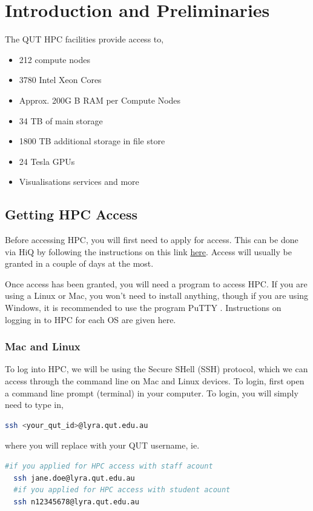 \section{Introduction and Preliminaries}
%
%
%
%
The QUT HPC facilities provide access to,
\begin{itemize}
\item 212 compute nodes
\item 3780 Intel Xeon Cores
\item Approx. 200G B RAM per Compute Nodes
\item 34 TB of main storage
\item 1800 TB additional storage in file store
\item 24 Tesla GPUs
\item Visualisations services and more
\end{itemize}
%
%
%
\subsection{Getting HPC Access}
Before accessing HPC, you will first need to apply for access. This can be done via HiQ by following the instructions on this link \href{https://qutvirtual4.qut.edu.au/group/research-students/doing-your-research/specialty-research-facilities/apply-for-a-hpc-account}{here}. Access will usually be granted in a couple of days at the most.
%
%
\par
%
%
Once access has been granted, you will need a program to access HPC. If you are using a Linux or Mac, you won't need to install anything, though if you are using Windows, it is recommended to use the program PuTTY \cite{putty}. Instructions on logging in to HPC for each OS are given here.
%
%
\subsubsection{Mac and Linux}
To log into HPC, we will be using the Secure SHell (SSH) protocol, which we can access through the command line on Mac and Linux devices. To login, first open a command line prompt (terminal) in your computer. To login, you will simply need to type in,
\begin{lstlisting}[language=bash, frame=single]
  ssh <your_qut_id>@lyra.qut.edu.au
\end{lstlisting}
where you will replace  with your QUT username, ie.
\begin{lstlisting}[language=bash, frame=single]
  #if you applied for HPC access with staff acount
  ssh jane.doe@lyra.qut.edu.au
  #if you applied for HPC access with student acount
  ssh n12345678@lyra.qut.edu.au
\end{lstlisting}
%
%
%
%
